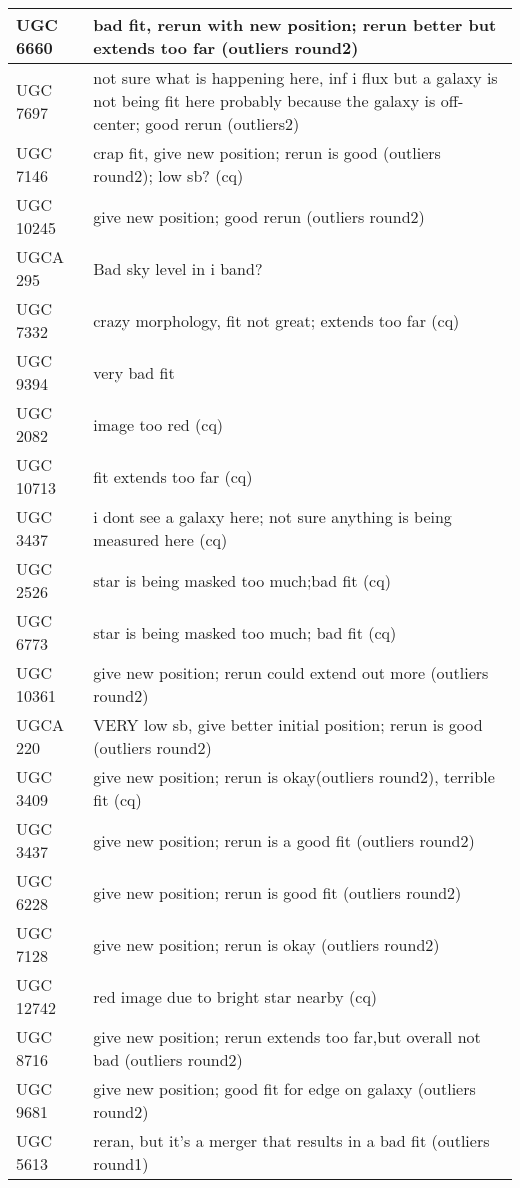 \documentclass[10pt]{article}
\begin{document}
\begin{landscape}
\begin{longtable}{|l|l|}
UGC 6660 & bad fit, rerun with new position; rerun better but extends too far (outliers round2)\\ \hline
UGC 7697 & not sure what is happening here, inf i flux but a galaxy is not being fit here probably because the galaxy is off-center; good rerun (outliers2) \\ \hline
UGC 7146 & crap fit, give new position; rerun is good (outliers round2); low sb? (cq) \\ \hline 
UGC 10245 & give new position; good rerun (outliers round2)\\ \hline 
UGCA 295 & Bad sky level in i band?\\ \hline 
UGC 7332 & crazy morphology, fit not great; extends too far (cq)\\ \hline 
UGC 9394 & very bad fit \\ \hline 
UGC 2082 & image too red (cq)\\ \hline 
UGC 10713 & fit extends too far (cq)\\ \hline 
UGC 3437 & i dont see a galaxy here; not sure anything is being measured here (cq)\\ \hline 
UGC 2526 & star is being masked too much;bad fit (cq)\\ \hline 
UGC 6773 & star is being masked too much; bad fit (cq)\\ \hline 
UGC 10361 & give new position; rerun could extend out more (outliers round2)\\ \hline 
UGCA 220 & VERY low sb, give better initial position; rerun is good (outliers round2)\\ \hline 
UGC 3409 & give new position; rerun is okay(outliers round2), terrible fit (cq)\\ \hline 
UGC 3437 & give new position; rerun is a good fit (outliers round2)\\ \hline 
UGC 6228 & give new position; rerun is good fit (outliers round2)\\ \hline 
UGC 7128 & give new position; rerun is okay (outliers round2)\\ \hline 
UGC 12742 & red image due to bright star nearby (cq)\\ \hline
UGC 8716 & give new position; rerun extends too far,but overall not bad (outliers round2)\\ \hline
UGC 9681 & give new position; good fit for edge on galaxy (outliers round2)\\ \hline
UGC 5613 & reran, but it's a merger that results in a bad fit (outliers round1)\\ \hline

\end{longtable}
\end{landscape}
\end{document}
